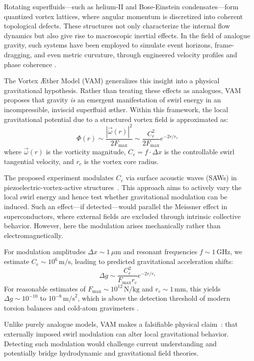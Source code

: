     Rotating superfluids—such as helium-II and Bose-Einstein condensates—form quantized vortex lattices, where angular momentum is discretized into coherent topological defects. These structures not only characterize the internal flow dynamics but also give rise to macroscopic inertial effects. In the field of analogue gravity, such systems have been employed to simulate event horizons, frame-dragging, and even metric curvature, through engineered velocity profiles and phase coherence \cite{barcelo2005analogue, volovik2003universe}.

    The Vortex \AE{}ther Model (VAM) generalizes this insight into a physical gravitational hypothesis. Rather than treating these effects as analogues, VAM proposes that gravity \emph{is} an emergent manifestation of swirl energy in an incompressible, inviscid superfluid \ae ther. Within this framework, the local gravitational potential due to a structured vortex field is approximated as:
    \[
        \Phi(r) \sim \frac{|\vec{\omega}(r)|^2}{2 F_{\text{max}}} \sim \frac{C_e^2}{2 F_{\text{max}}} e^{-2r/r_c}
    \]
    where \( \vec{\omega}(r) \) is the vorticity magnitude, \( C_e = f \cdot \Delta x \) is the controllable swirl tangential velocity, and \( r_c \) is the vortex core radius.

    The proposed experiment modulates \( C_e \) via surface acoustic waves (SAWs) in piezoelectric-vortex-active structures~\cite{iskandarani2025experimentalCe}. This approach aims to actively vary the local swirl energy and hence test whether gravitational modulation can be induced. Such an effect—if detected—would parallel the Meissner effect in superconductors, where external fields are excluded through intrinsic collective behavior. However, here the modulation arises mechanically rather than electromagnetically.

    For modulation amplitudes \( \Delta x \sim 1 \, \mu\text{m} \) and resonant frequencies \( f \sim 1\, \text{GHz} \), we estimate \( C_e \sim 10^6 \, \text{m/s} \), leading to predicted gravitational acceleration shifts:
    \[
        \Delta g \sim \frac{C_e^2}{F_{\text{max}} r_c} e^{-2r/r_c}
    \]
    For reasonable estimates of \( F_{\text{max}} \sim 10^{12} \, \text{N/kg} \) and \( r_c \sim 1 \, \text{mm} \), this yields \( \Delta g \sim 10^{-10} \) to \( 10^{-8} \, \text{m/s}^2 \), which is above the detection threshold of modern torsion balances and cold-atom gravimeters \cite{packard1998superfluid, zmeev2018masssensor}.

    Unlike purely analogue models, VAM makes a falsifiable physical claim~\cite{iskandarani2025benchmark}: that externally imposed swirl modulation can alter local gravitational behavior. Detecting such modulation would challenge current understanding and potentially bridge hydrodynamic and gravitational field theories.

